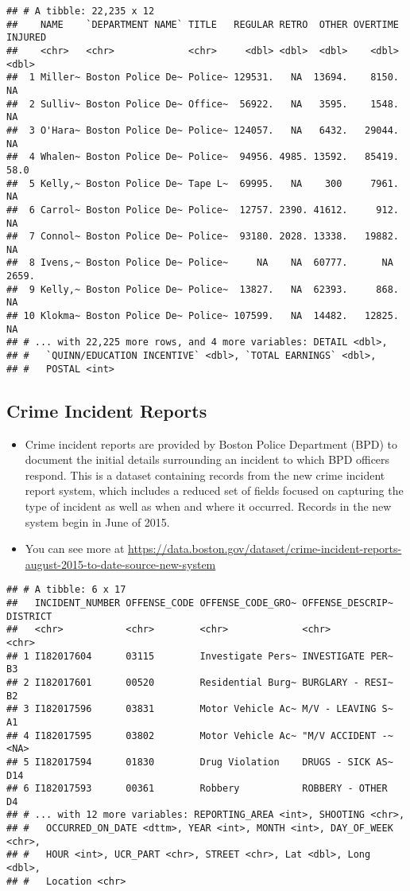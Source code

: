 \documentclass[]{article}
\begin{document}
\begin{verbatim}
## # A tibble: 22,235 x 12
##    NAME    `DEPARTMENT NAME` TITLE   REGULAR RETRO  OTHER OVERTIME INJURED
##    <chr>   <chr>             <chr>     <dbl> <dbl>  <dbl>    <dbl>   <dbl>
##  1 Miller~ Boston Police De~ Police~ 129531.   NA  13694.    8150.    NA  
##  2 Sulliv~ Boston Police De~ Office~  56922.   NA   3595.    1548.    NA  
##  3 O'Hara~ Boston Police De~ Police~ 124057.   NA   6432.   29044.    NA  
##  4 Whalen~ Boston Police De~ Police~  94956. 4985. 13592.   85419.    58.0
##  5 Kelly,~ Boston Police De~ Tape L~  69995.   NA    300     7961.    NA  
##  6 Carrol~ Boston Police De~ Police~  12757. 2390. 41612.     912.    NA  
##  7 Connol~ Boston Police De~ Police~  93180. 2028. 13338.   19882.    NA  
##  8 Ivens,~ Boston Police De~ Police~     NA    NA  60777.      NA   2659. 
##  9 Kelly,~ Boston Police De~ Police~  13827.   NA  62393.     868.    NA  
## 10 Klokma~ Boston Police De~ Police~ 107599.   NA  14482.   12825.    NA  
## # ... with 22,225 more rows, and 4 more variables: DETAIL <dbl>,
## #   `QUINN/EDUCATION INCENTIVE` <dbl>, `TOTAL EARNINGS` <dbl>,
## #   POSTAL <int>
\end{verbatim}

\subsection{Crime Incident Reports}\label{crime-incident-reports}

\begin{itemize}
\item
  Crime incident reports are provided by Boston Police Department (BPD)
  to document the initial details surrounding an incident to which BPD
  officers respond. This is a dataset containing records from the new
  crime incident report system, which includes a reduced set of fields
  focused on capturing the type of incident as well as when and where it
  occurred. Records in the new system begin in June of 2015.
\item
  You can see more at
  \url{https://data.boston.gov/dataset/crime-incident-reports-august-2015-to-date-source-new-system}
\end{itemize}

\begin{verbatim}
## # A tibble: 6 x 17
##   INCIDENT_NUMBER OFFENSE_CODE OFFENSE_CODE_GRO~ OFFENSE_DESCRIP~ DISTRICT
##   <chr>           <chr>        <chr>             <chr>            <chr>   
## 1 I182017604      03115        Investigate Pers~ INVESTIGATE PER~ B3      
## 2 I182017601      00520        Residential Burg~ BURGLARY - RESI~ B2      
## 3 I182017596      03831        Motor Vehicle Ac~ M/V - LEAVING S~ A1      
## 4 I182017595      03802        Motor Vehicle Ac~ "M/V ACCIDENT -~ <NA>    
## 5 I182017594      01830        Drug Violation    DRUGS - SICK AS~ D14     
## 6 I182017593      00361        Robbery           ROBBERY - OTHER  D4      
## # ... with 12 more variables: REPORTING_AREA <int>, SHOOTING <chr>,
## #   OCCURRED_ON_DATE <dttm>, YEAR <int>, MONTH <int>, DAY_OF_WEEK <chr>,
## #   HOUR <int>, UCR_PART <chr>, STREET <chr>, Lat <dbl>, Long <dbl>,
## #   Location <chr>
\end{verbatim}
\end{document}
